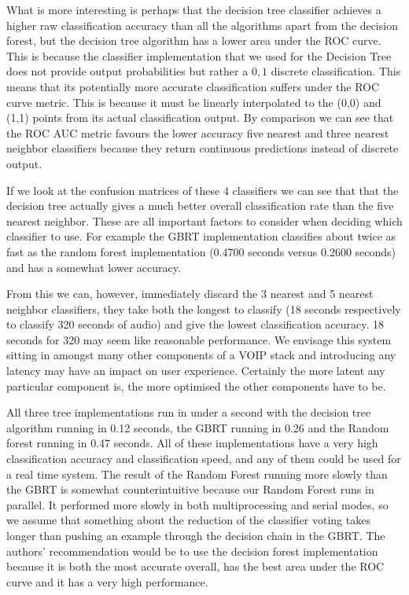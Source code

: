 \documentclass[ %
                    author={Sam Phippen},
                supervisor={Dr. Rafal Bogacz},
                     title={Real time voice activity detectors in noisy personal computing environments},
                  subtitle={},
                    degree={MEng},
                      year={2012} ]{thesis}
\begin{document}
What is more interesting is perhaps that the decision tree classifier achieves
a higher raw classification accuracy than all the algorithms apart from the
decision forest, but the decision tree algorithm has a lower area under the ROC
curve. This is because the classifier implementation that we used for the
Decision Tree does not provide output probabilities but rather a ${0,1}$
discrete classification. This means that its potentially more accurate
classification suffers under the ROC curve metric. This is because it must be
linearly interpolated to the (0,0) and (1,1) points from its actual
classification output. By comparison we can see that the ROC AUC metric favours
the lower accuracy five nearest and three nearest neighbor classifiers because
they return continuous predictions instead of discrete output.

If we look at the confusion matrices of these 4 classifiers we can see
that that the decision tree actually gives a much better overall classification
rate than the five nearest neighbor. These are all important factors to
consider when deciding which classifier to use. For example the GBRT
implementation classifies about twice as fast as the random forest
implementation (0.4700 seconds versus 0.2600 seconds) and has a somewhat lower
accuracy.

From this we can, however, immediately discard the 3 nearest and 5 nearest
neighbor classifiers, they take both the longest to classify (18 seconds
respectively to classify 320 seconds of audio) and give the lowest
classification accuracy. 18 seconds for 320 may seem like reasonable
performance. We envisage this system sitting in amongst many other components
of a VOIP stack and introducing any latency may have an impact on user
experience. Certainly the more latent any particular component is, the more
optimised the other components have to be.

All three tree implementations run in under a second with the decision tree
algorithm running in 0.12 seconds, the GBRT running in 0.26 and the Random
forest running in 0.47 seconds. All of these implementations have a very high
classification accuracy and classification speed, and any of them could be used
for a real time system. The result of the Random Forest running more slowly
than the GBRT is somewhat counterintuitive because our Random Forest runs in
parallel. It performed more slowly in both multiprocessing and serial
modes, so we assume that something about the reduction of the classifier voting
takes longer than pushing an example through the decision chain in the GBRT.
The authors' recommendation would be to use the decision forest implementation
because it is both the most accurate overall, has the best area under the ROC
curve and it has a very high performance.
\end{document}

